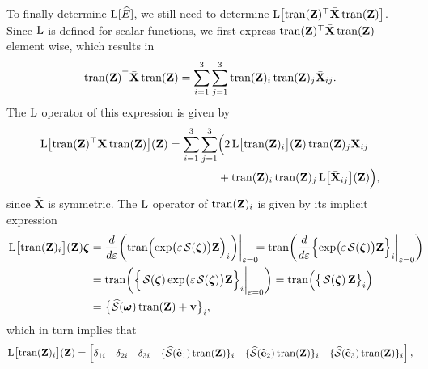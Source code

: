 To finally determine $\operatorname{L}[\widehat{E}]$, we still need to determine $\operatorname{L}\bigl[\operatorname{tran}(\mathbf{Z})^\top\bar{\mathbf{X}}\operatorname{tran}(\mathbf{Z})\bigr]$. Since $\operatorname{L}$ is defined for scalar functions, we first express $\operatorname{tran}(\mathbf{Z})^\top\bar{\mathbf{X}}\operatorname{tran}(\mathbf{Z})$ element wise, which results in
\begin{align}
    \operatorname{tran}(\mathbf{Z})^\top\bar{\mathbf{X}}\operatorname{tran}(\mathbf{Z}) = \sum_{i=1}^{3}\sum_{j=1}^{3} \operatorname{tran}(\mathbf{Z})_{i}\operatorname{tran}(\mathbf{Z})_{j}\bar{\mathbf{X}}_{ij}.
\end{align}
The $\operatorname{L}$ operator of this expression is given by
\begin{align}
    \begin{split}
        \operatorname{L}\bigl[\operatorname{tran}(\mathbf{Z})^\top\bar{\mathbf{X}}\operatorname{tran}(\mathbf{Z})\bigr](\mathbf{Z}) = \sum_{i=1}^{3}\sum_{j=1}^{3}& \Bigl(2\operatorname{L}\bigl[\operatorname{tran}(\mathbf{Z})_{i}\bigr](\mathbf{Z})\operatorname{tran}(\mathbf{Z})_{j}\bar{\mathbf{X}}_{ij} \\
        & +\operatorname{tran}(\mathbf{Z})_{i}\operatorname{tran}(\mathbf{Z})_{j}\operatorname{L}\bigl[\bar{\mathbf{X}}_{ij}\bigr](\mathbf{Z})\Bigr),
    \end{split}
\end{align}
since $\bar{\mathbf{X}}$ is symmetric. The $\operatorname{L}$ operator of $\operatorname{tran}(\mathbf{Z})_{i}$ is given by its implicit expression
\begin{align}
    \begin{split}
        \Lop\bigl[\trans(\mathbf{Z})_{i}\bigr](\mathbf{Z}) \boldsymbol{\zeta}&= 
        \frac{d}{d\varepsilon}\biggl(\trans\Bigl(\exp\bigl(\varepsilon\SL[\boldsymbol{\zeta}]\bigr)\mathbf{Z}\Bigr)_{i}\biggr)\biggr|_{\varepsilon=0}\!\!\! = 
        \trans\biggl(\frac{d}{d\varepsilon}\Bigl\{\exp\bigl(\varepsilon\SL[\boldsymbol{\zeta}]\bigr)\mathbf{Z}\Bigr\}_{i}\biggr|_{\varepsilon=0}\biggr) \!\!\!\!\!\!\\
        &= \trans\biggl(\Bigl\{\SL[\boldsymbol{\zeta}]\exp\bigl(\varepsilon\SL[\boldsymbol{\zeta}]\bigr)\mathbf{Z}\Bigr\}_{i}\biggr|_{\varepsilon=0}\biggr)
        = \trans\Bigl(\bigl\{\SL[\boldsymbol{\zeta}]\mathbf{Z}\bigr\}_{i}\Bigr)\\
        &= \bigl\{\widehat{\mathcal{S}}(\boldsymbol{\omega})\trans(\mathbf{Z}) + \mathbf{v}\bigr\}_{i},
    \end{split}
\end{align}
which in turn implies that
\begin{align}
    \operatorname{L}\bigl[\operatorname{tran}(\mathbf{Z})_{i}\bigr](\mathbf{Z}) = \begin{bmatrix}
        \delta_{1i} & \delta_{2i} & \delta_{3i} & \{\widehat{\mathcal{S}}(\widehat{\mathbf{e}}_1)\operatorname{tran}(\mathbf{Z})\}_i & \{\widehat{\mathcal{S}}(\widehat{\mathbf{e}}_2)\operatorname{tran}(\mathbf{Z})\}_i & \{\widehat{\mathcal{S}}(\widehat{\mathbf{e}}_3)\operatorname{tran}(\mathbf{Z})\}_i
    \end{bmatrix},
\end{align}
